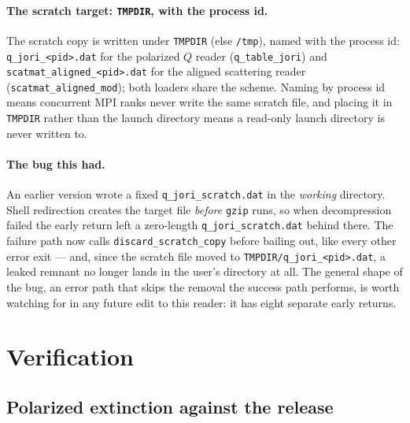 \documentclass{my_memo}
\newcommand{\code}[1]{\texttt{#1}}
\begin{document}
\paragraph{The scratch target: \code{TMPDIR}, with the process id.} The scratch
copy is written under \code{TMPDIR} (else \code{/tmp}), named with the process id:
\code{q\_jori\_<pid>.dat} for the polarized $Q$ reader (\code{q\_table\_jori}) and
\code{scatmat\_aligned\_<pid>.dat} for the aligned scattering reader
(\code{scatmat\_aligned\_mod}); both loaders share the scheme. Naming by process id
means concurrent MPI ranks never write the same scratch file, and placing it in
\code{TMPDIR} rather than the launch directory means a read-only launch directory
is never written to.

\paragraph{The bug this had.} An earlier version wrote a fixed
\code{q\_jori\_scratch.dat} in the \emph{working} directory. Shell redirection
creates the target file \emph{before} \code{gzip} runs, so when decompression
failed the early return left a zero-length \code{q\_jori\_scratch.dat} behind
there. The failure path now calls \code{discard\_scratch\_copy} before bailing
out, like every other error exit --- and, since the scratch file moved to
\code{TMPDIR/q\_jori\_<pid>.dat}, a leaked remnant no longer lands in the user's
directory at all. The general shape of the bug, an error path that skips the
removal the success path performs, is worth watching for in any future edit to
this reader: it has eight separate early returns.

\section{Verification}

\subsection{Polarized extinction against the release}
\end{document}
